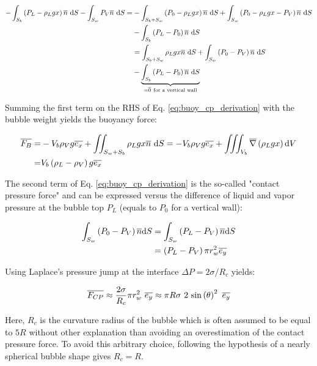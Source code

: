 \begin{align}
\nonumber- \int_{S_{b}}\left( P_{L} - \rho_{L}gx \right)\overline{n}\ \mathrm{d}S - \int_{S_{w}} P_{V}\overline{n}\ \mathrm{d}S =& - \int_{S_{b} + S_{w}} \left( P_{0} - \rho_{L}gx \right)\overline{n}\ \mathrm{d}S + \int_{S_{w}} \left( P_{0} - \rho_{L}gx - P_{V} \right)\overline{n}\ \mathrm{d}S \\
\nonumber & - \int_{S_{b}} \left( P_{L}-P_{0} \right)\overline{n}\ \mathrm{d}S \\
\nonumber & = \int_{S_{b} + S_{w}} \rho_{L} g x \overline{n}\ \mathrm{d}S + \int_{S_{w}}\left( P_{0} - P_{V} \right)\overline{n}\ \mathrm{d}S\\
& - \underbrace{ \int_{S_{b}} \left( P_{L} - P_{0} \right)\overline{n}\ \mathrm{d}S }_{=\overline{0}\ \text{for a vertical wall}}
\label{eq:buoy_cp_derivation}
\end{align}

Summing the first term on the RHS of Eq. \ref{eq:buoy_cp_derivation} with the bubble weight yields the buoyancy force:

\begin{align}
\vect{F_{B}} =& -V_{b}\rho_{V} g \vect{e_{x}} + \iint_{S_{w}+S_{b}}\rho_{L} g x \vect{n}\ \mathrm{d}S = -V_{b} \rho_{V} g \vect{e_{x}} + \iiint_{V_{b}} \grad{\rho_{L} g x}\mathrm{d}V \\
%
=& V_{b} \parth{\rho_{L}-\rho_{V}} g \vect{e_{x}}
\label{eq:force_buoyancy}
\end{align}


The second term of Eq. \ref{eq:buoy_cp_derivation} is the so-called "contact pressure force" and can be expressed versus the difference of liquid and vapor pressure at the bubble top $P_{L}$ (equals to $P_{0}$ for a vertical wall):

\begin{align}
\int_{S_{w}} \parth{P_{0} - P_{V}}\vect{n} \mathrm{d}S &= \int_{S_{w}} \parth{P_{L} - P_{V}}\vect{n} \mathrm{d}S\\
%
&= \parth{P_{L} - P_{V}} \pi r_{w}^{2} \vect{e_{y}}
\end{align}

\npar
Using Laplace's pressure jump at the interface $\Delta P = 2\sigma / R_{c}$ yields:

\begin{align}
\overline{F_{CP}}  \approx \frac{2\sigma}{R_{c}} \pi r_{w}^{2}\  \overline{e_{y}}
\approx \pi R \sigma\ 2\ \mathrm{sin}\left( \theta \right)^{2}\ \overline{e_{y}}
\label{eq:FCP}
\end{align}

Here, $R_{c}$ is the curvature radius of the bubble which is often assumed to be equal to $5R$ \cite{klausner_vapor_1993, sugrue_modified_2016, mazzocco_reassessed_2018} without other explanation than avoiding an overestimation of the contact pressure force. To avoid this arbitrary choice, following the hypothesis of a nearly spherical bubble shape gives $R_{c}=R$.


